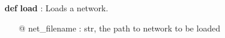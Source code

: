 {\begin{minipage}{\textwidth}
\begin{tcolorbox}[boxsep=0pt,top=10pt,left=10pt,right=10pt, bottom=10pt, arc=0pt, auto outer arc, colback=white, colframe=lightgray]
\begin{itemize}
\begin{itemize}
\item[@] net\_filename \hspace{15pt}	: str, the path to save network as
\end{itemize}
\item[\textbf{def}] \textbf{load} : Loads a network.
\begin{itemize} 
\item[@] net\_filename \hspace{15pt}	: str, the path to network to be loaded
\end{itemize}
\end{itemize}
\normalsize
\end{tcolorbox}
\end{minipage}}
